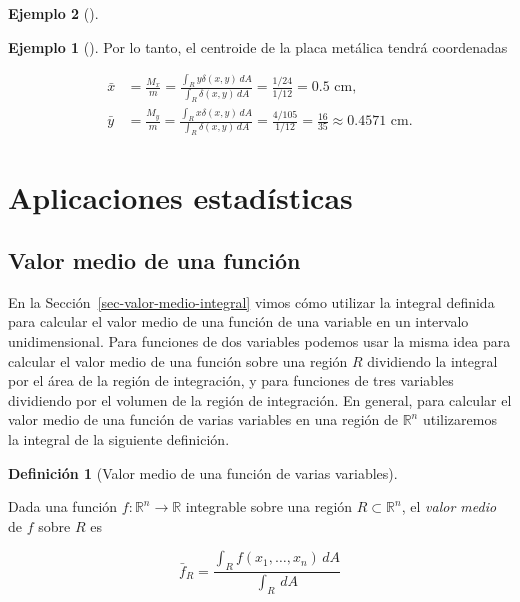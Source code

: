 \documentclass[
  a4paper,
]{scrreport}
\theoremstyle{definition}
\newtheorem{example}{Ejemplo}[chapter]
\theoremstyle{plain}
\theoremstyle{definition}
\newtheorem{definition}{Definición}[chapter]
\theoremstyle{definition}
\theoremstyle{plain}
\theoremstyle{plain}
\theoremstyle{remark}
\begin{document}
\begin{example}[]
\begin{example}[]
Por lo tanto, el centroide de la placa metálica tendrá coordenadas

\begin{align*}
\bar x 
&= \frac{M_x}{m}
= \frac{\int_R y\delta(x,y)\,dA}{\int_R \delta(x,y)\,dA} 
= \frac{1/24}{1/12} = 0.5 \mbox{ cm},\\
\bar y
&= \frac{M_y}{m}
= \frac{\int_R x\delta(x,y)\,dA}{\int_R \delta(x,y)\,dA}
= \frac{4/105}{1/12} = \frac{16}{35} \approx 0.4571  \mbox{ cm}.
\end{align*}

\end{example}

\section{Aplicaciones
estadísticas}\label{aplicaciones-estaduxedsticas-1}

\subsection{Valor medio de una
función}\label{valor-medio-de-una-funciuxf3n}

En la Sección~\ref{sec-valor-medio-integral} vimos cómo utilizar la
integral definida para calcular el valor medio de una función de una
variable en un intervalo unidimensional. Para funciones de dos variables
podemos usar la misma idea para calcular el valor medio de una función
sobre una región \(R\) dividiendo la integral por el área de la región
de integración, y para funciones de tres variables dividiendo por el
volumen de la región de integración. En general, para calcular el valor
medio de una función de varias variables en una región de
\(\mathbb{R}^n\) utilizaremos la integral de la siguiente definición.

\begin{definition}[Valor medio de una función de varias
variables]\protect\hypertarget{def-valor-medio-funcion-varias-variables}{}\label{def-valor-medio-funcion-varias-variables}

Dada una función \(f:\mathbb{R}^n\to \mathbb{R}\) integrable sobre una
región \(R\subset \mathbb{R}^n\), el \emph{valor medio} de \(f\) sobre
\(R\) es

\[
\bar{f}_R = \frac{\int_R f(x_1,\ldots,x_n)\,dA}{\int_R\,dA}
\]

\end{definition}

\begin{tcolorbox}[enhanced jigsaw, leftrule=.75mm, colbacktitle=quarto-callout-note-color!10!white, toprule=.15mm, opacityback=0, opacitybacktitle=0.6, toptitle=1mm, breakable, bottomtitle=1mm, colframe=quarto-callout-note-color-frame, rightrule=.15mm, titlerule=0mm, title=\textcolor{quarto-callout-note-color}{\faInfo}\hspace{0.5em}{Nota}, arc=.35mm, left=2mm, bottomrule=.15mm, colback=white, coltitle=black]


\end{tcolorbox}
\end{example}
\end{document}
